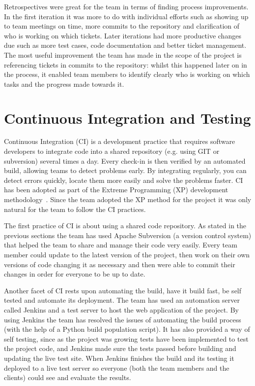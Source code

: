 \documentclass{l3proj}
\begin{document}
Retrospectives were great for the team in terms of finding process improvements. In the first iteration it was more to do with individual efforts such as showing up to team meetings on time, more commits to the repository and clarification of who is working on which tickets. Later iterations had more productive changes due such as more test cases, code documentation and better ticket management. The most useful improvement the team has made in the scope of the project is referencing tickets in commits to the repository: whilst this happened later on in the process, it enabled team members to identify clearly who is working on which tasks and the progress made towards it.


\section{Continuous Integration and Testing}
\label{sec:continuous-integration}

Continuous Integration (CI) is a development practice that requires software developers to integrate code into a shared repository (e.g. using GIT or subversion) several times a day. Every check-in is then verified by an automated build, allowing teams to detect problems early. By integrating regularly, you can detect errors quickly, locate them more easily and solve the problems faster. CI has been adopted as part of the Extreme Programming (XP) development methodology~\cite{ContinuousIntegration}. Since the team adopted the XP method for the project it was only natural for the team to follow the CI practices.

The first practice of CI is about using a shared code repository. As stated in the previous sections the team has used Apache Subversion (a version control system) that helped the team to share and manage their code very easily. Every team member could update to the latest version of the project, then work on their own versions of code changing it as necessary and then were able to commit their changes in order for everyone to be up to date.

Another facet of CI rests upon automating the build, have it build fast, be self tested and automate its deployment. The team has used an automation server called Jenkins and a test server to host the web application of the project. By using Jenkins the team has resolved the issues of automating the build process (with the help of a Python build population script). It has also provided a way of self testing, since as the project was growing tests have been implemented to test the project code, and Jenkins made sure the tests passed before building and updating the live test site. When Jenkins finishes the build and its testing it deployed to a live test server so everyone (both the team members and the clients) could see and evaluate the results.
\end{document}

